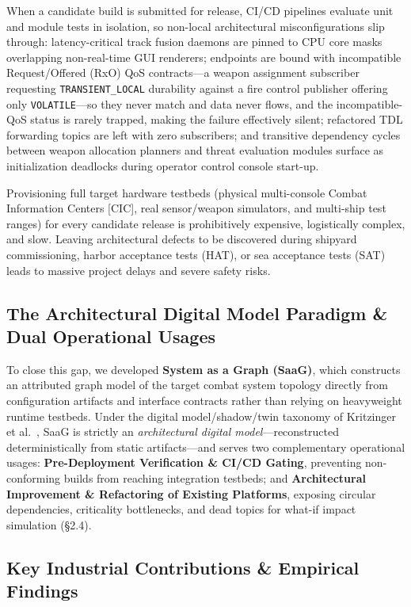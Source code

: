 \documentclass[sigconf,9pt]{acmart}
\begin{document}
When a candidate build is submitted for release, CI/CD pipelines evaluate unit and module tests in isolation, so non-local architectural misconfigurations slip through: latency-critical track fusion daemons are pinned to CPU core masks overlapping non-real-time GUI renderers; endpoints are bound with incompatible Request/Offered (RxO) QoS contracts---a weapon assignment subscriber requesting \texttt{TRANSIENT\_LOCAL} durability against a fire control publisher offering only \texttt{VOLATILE}---so they never match and data never flows, and the incompatible-QoS status is rarely trapped, making the failure effectively silent; refactored TDL forwarding topics are left with zero subscribers; and transitive dependency cycles between weapon allocation planners and threat evaluation modules surface as initialization deadlocks during operator control console start-up.

Provisioning full target hardware testbeds (physical multi-console Combat Information Centers [CIC], real sensor/weapon simulators, and multi-ship test ranges) for every candidate release is prohibitively expensive, logistically complex, and slow. Leaving architectural defects to be discovered during shipyard commissioning, harbor acceptance tests (HAT), or sea acceptance tests (SAT) leads to massive project delays and severe safety risks.

\subsection{The Architectural Digital Model Paradigm \& Dual Operational Usages}

To close this gap, we developed \textbf{System as a Graph (SaaG)}, which constructs an attributed graph model of the target combat system topology directly from configuration artifacts and interface contracts rather than relying on heavyweight runtime testbeds. Under the digital model/shadow/twin taxonomy of Kritzinger et al.~\cite{kritzinger2018}, SaaG is strictly an \emph{architectural digital model}---reconstructed deterministically from static artifacts---and serves two complementary operational usages: \textbf{Pre-Deployment Verification \& CI/CD Gating}, preventing non-conforming builds from reaching integration testbeds; and \textbf{Architectural Improvement \& Refactoring of Existing Platforms}, exposing circular dependencies, criticality bottlenecks, and dead topics for what-if impact simulation (\S2.4).

\subsection{Key Industrial Contributions \& Empirical Findings}
\end{document}
